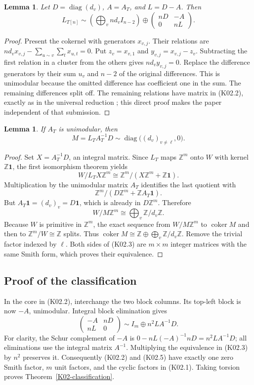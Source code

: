 \documentclass[11pt,a4paper]{article}
\newtheorem{lemma}[theorem]{Lemma}
\theoremstyle{definition}\newtheorem{definition}[theorem]{Definition}
\theoremstyle{remark}\newtheorem{remark}[theorem]{Remark}
\newcommand{\Z}{\mathbb Z}\newcommand{\Q}{\mathbb Q}\newcommand{\F}{\mathbb F}
\DeclareMathOperator{\coker}{coker}\DeclareMathOperator{\diag}{diag}\DeclareMathOperator{\rank}{rank}
\numberwithin{equation}{section}
\begin{document}
\begin{lemma}\label{K02-compression}
Let $D=\diag(d_v)$, $A=A_T$, and $L=D-A$. Then
\[
 L_{T[n]}\sim\left(\bigoplus_v nd_vI_{n-2}\right)
 \oplus\begin{pmatrix}nD&-A\\0&nL\end{pmatrix}.              \tag{K02.2}
\]
\end{lemma}
\begin{proof}
Present the cokernel with generators $x_{v,j}$. Their relations are $nd_vx_{v,j}-\sum_{u\sim v}\sum_tx_{u,t}=0$. Put $z_v=x_{v,1}$ and $y_{v,j}=x_{v,j}-z_v$. Subtracting the first relation in a cluster from the others gives $nd_vy_{v,j}=0$. Replace the difference generators by their sum $u_v$ and $n-2$ of the original differences. This is unimodular because the omitted difference has coefficient one in the sum. The remaining differences split off. The remaining relations have matrix in (K02.2), exactly as in the universal reduction \cite{ref031}; this direct proof makes the paper independent of that submission.
\end{proof}

\begin{lemma}\label{K02-product}
If $A_T$ is unimodular, then
\[
 M=L_TA_T^{-1}D\sim \diag\bigl((d_v)_{v\ne\ell},0\bigr).       \tag{K02.3}
\]
\end{lemma}
\begin{proof}
Set $X=A_T^{-1}D$, an integral matrix. Since $L_T$ maps $\Z^m$ onto $W$ with kernel $\Z\mathbf1$, the first isomorphism theorem yields
\[
 W/L_TX\Z^m\cong \Z^m/(X\Z^m+\Z\mathbf1).
\]
Multiplication by the unimodular matrix $A_T$ identifies the last quotient with
\[
 \Z^m/(D\Z^m+\Z A_T\mathbf1).
\]
But $A_T\mathbf1=(d_v)_v=D\mathbf1$, which is already in $D\Z^m$. Therefore
\[
 W/M\Z^m\cong\bigoplus_v\Z/d_v\Z.                          \tag{K02.4}
\]
Because $W$ is primitive in $\Z^m$, the exact sequence from $W/M\Z^m$ to $\coker M$ and then to $\Z^m/W\cong\Z$ splits. Thus $\coker M\cong\Z\oplus\bigoplus_v\Z/d_v\Z$. Remove the trivial factor indexed by $\ell$. Both sides of (K02.3) are $m\times m$ integer matrices with the same Smith form, which proves their equivalence.
\end{proof}

\subsection{Proof of the classification}\label{K02-sec-3}
In the core in (K02.2), interchange the two block columns. Its top-left block is now $-A$, unimodular. Integral block elimination gives
\[
 \begin{pmatrix}-A&nD\\nL&0\end{pmatrix}
 \sim I_m\oplus n^2LA^{-1}D.                                \tag{K02.5}
\]
For clarity, the Schur complement of $-A$ is $0-nL(-A)^{-1}nD=n^2LA^{-1}D$; all eliminations use the integral matrix $A^{-1}$. Multiplying the equivalence in (K02.3) by $n^2$ preserves it. Consequently (K02.2) and (K02.5) have exactly one zero Smith factor, $m$ unit factors, and the cyclic factors in (K02.1). Taking torsion proves Theorem~\ref{K02-classification}.
\end{document}
